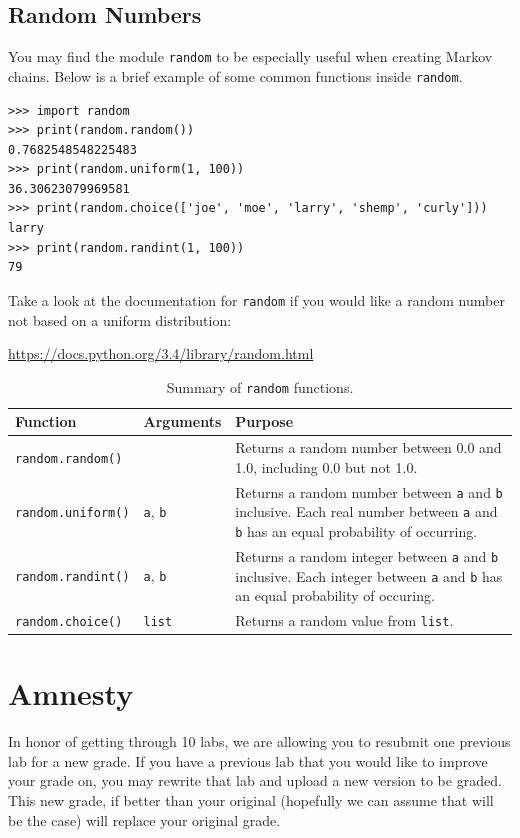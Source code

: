 \documentclass[11pt]{cselabheader}
\begin{document}
\subsection{Random Numbers}
\label{subsec:random}
You may find the module \lstinline{random} to be especially useful when
creating Markov chains. Below is a brief example of some common functions
inside \lstinline{random}.

\begin{lstlisting}[style=ipython]
>>> import random
>>> print(random.random())
0.7682548548225483
>>> print(random.uniform(1, 100))
36.30623079969581
>>> print(random.choice(['joe', 'moe', 'larry', 'shemp', 'curly']))
larry
>>> print(random.randint(1, 100))
79
\end{lstlisting}

Take a look at the documentation for \lstinline!random! if you would like a
random number not based on a uniform distribution:
\begin{center}
  \url{https://docs.python.org/3.4/library/random.html}
\end{center}

\begin{table}[!ht]
  \centering
  \begin{tabular}{p{3.0cm} p{2cm} p{10cm}}
    \toprule
    \bfseries Function & \bfseries Arguments & \bfseries Purpose \\
    \midrule
    \lstinline{random.random()} & & Returns a random number between 0.0 and 1.0,
    including 0.0 but not 1.0.\\
    \lstinline{random.uniform()} & \lstinline{a}, \lstinline{b} & Returns a
    random number between \lstinline{a} and \lstinline{b} inclusive. Each real number between
    \lstinline!a! and \lstinline!b! has an equal probability of occurring.\\
    \lstinline{random.randint()} & \lstinline{a}, \lstinline{b} & Returns a
    random integer between \lstinline{a} and \lstinline{b} inclusive. Each integer between
    \lstinline!a! and \lstinline!b! has an equal probability of occuring.\\
    \lstinline{random.choice()} & \lstinline{list} & Returns a random value from \lstinline{list}.\\
    \bottomrule
  \end{tabular}
  \caption{Summary of \lstinline{random} functions.}
  \label{tab:rand}
\end{table}


\clearpage
\section{Amnesty}
\label{sec:amnesty}
In honor of getting through 10 labs, we are allowing you to resubmit one previous lab for a new grade. If you have a previous lab that you would like to improve your grade on, you may rewrite that lab and upload a new version to be graded. This new grade, if better than your original (hopefully we can assume that will be the case) will replace your original grade.
\end{document}
